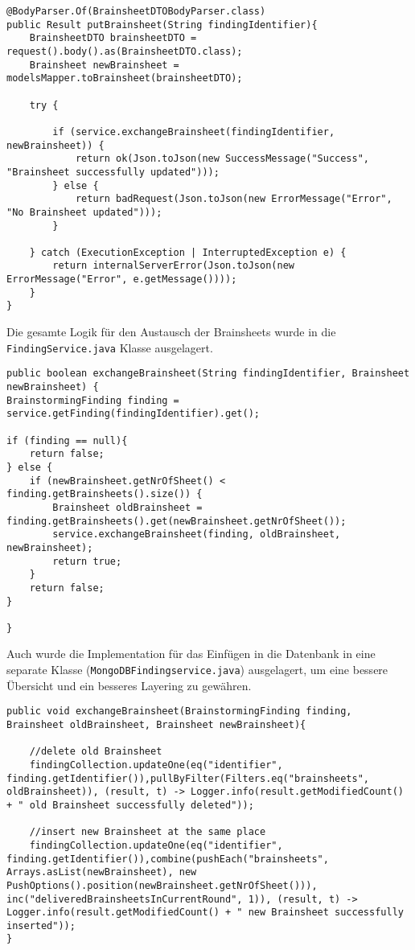 \begin{lstlisting}[caption={PutBrainsheet nach Refactoring}, label=putBrainsheetNachRef]
@BodyParser.Of(BrainsheetDTOBodyParser.class)
public Result putBrainsheet(String findingIdentifier){
    BrainsheetDTO brainsheetDTO = request().body().as(BrainsheetDTO.class);
    Brainsheet newBrainsheet = modelsMapper.toBrainsheet(brainsheetDTO);

    try {

        if (service.exchangeBrainsheet(findingIdentifier, newBrainsheet)) {
            return ok(Json.toJson(new SuccessMessage("Success", "Brainsheet successfully updated")));
        } else {
            return badRequest(Json.toJson(new ErrorMessage("Error", "No Brainsheet updated")));
        }

    } catch (ExecutionException | InterruptedException e) {
        return internalServerError(Json.toJson(new ErrorMessage("Error", e.getMessage())));
    }
}
\end{lstlisting}

Die gesamte Logik für den Austausch der Brainsheets wurde in die \texttt{FindingService\-.java} Klasse ausgelagert.

\begin{lstlisting}[caption={Exchange Brainsheet im Business Layer}, label=exchangeBrainsheetBusinessLayer]
public boolean exchangeBrainsheet(String findingIdentifier, Brainsheet newBrainsheet) {
BrainstormingFinding finding = service.getFinding(findingIdentifier).get();

if (finding == null){
    return false;
} else {
    if (newBrainsheet.getNrOfSheet() < finding.getBrainsheets().size()) {
        Brainsheet oldBrainsheet = finding.getBrainsheets().get(newBrainsheet.getNrOfSheet());
        service.exchangeBrainsheet(finding, oldBrainsheet, newBrainsheet);
        return true;
    }
    return false;
}

}
\end{lstlisting}

Auch wurde die Implementation für das Einfügen in die Datenbank in eine separate Klasse (\texttt{MongoDBFindingservice.java}) ausgelagert, um eine bessere Übersicht und ein besseres Layering zu gewähren.

\begin{lstlisting}[caption={Exchange Brainsheet im Data Access Layer}, label=exchangeBrainsheetDAL]
public void exchangeBrainsheet(BrainstormingFinding finding, Brainsheet oldBrainsheet, Brainsheet newBrainsheet){
    
    //delete old Brainsheet
    findingCollection.updateOne(eq("identifier", finding.getIdentifier()),pullByFilter(Filters.eq("brainsheets", oldBrainsheet)), (result, t) -> Logger.info(result.getModifiedCount() + " old Brainsheet successfully deleted"));
    
    //insert new Brainsheet at the same place
    findingCollection.updateOne(eq("identifier", finding.getIdentifier()),combine(pushEach("brainsheets", Arrays.asList(newBrainsheet), new PushOptions().position(newBrainsheet.getNrOfSheet())), inc("deliveredBrainsheetsInCurrentRound", 1)), (result, t) -> Logger.info(result.getModifiedCount() + " new Brainsheet successfully inserted"));
}
\end{lstlisting}

